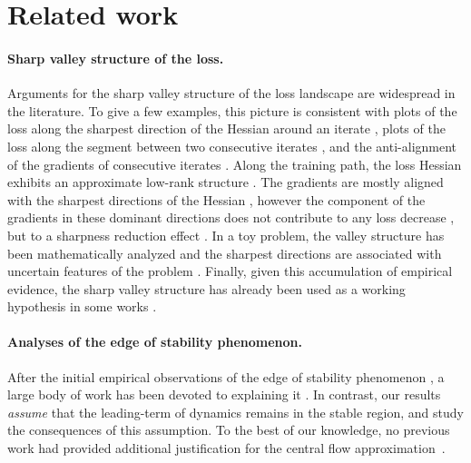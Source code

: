 \documentclass[11pt,english,reqno]{article}
\theoremstyle{plain}
\theoremstyle{definition}
\theoremstyle{remark}
\numberwithin{equation}{section}
\begin{document}
\section{Related work}
\label{sec:related}

\paragraph{Sharp valley structure of the loss.} Arguments for the sharp valley structure of the loss landscape are widespread in the literature. To give a few examples, this picture is consistent with plots of the loss along the sharpest direction of the Hessian around an iterate \cite{jastrzkebski2018relation}, plots of the loss along the segment between two consecutive iterates \cite{xing2018walk}, and the anti-alignment of the gradients of consecutive iterates \cite{xing2018walk}. Along the training path, the loss Hessian exhibits an approximate low-rank structure \cite{sagun2016eigenvalues, sagun2017empirical, ghorbani2019investigation, pmlr-v97-papyan19a, papyan2020traces,ben2024high}. The gradients are mostly aligned with the sharpest directions of the Hessian \cite{gur2018gradient,li2020hessian}, however the component of the gradients in these dominant directions does not contribute to any loss decrease \cite{jastrzkebski2018relation,song2025does}, but to a sharpness reduction effect \cite{so2026mini}. In a toy problem, the valley structure has been mathematically analyzed and the sharpest directions are associated with uncertain features of the problem \cite{wen2024understanding}. Finally, given this accumulation of empirical evidence, the sharp valley structure has already been used as a working hypothesis in some works \cite{liu2025focus, liu2025neural}. 

\paragraph{Analyses of the edge of stability phenomenon.} After the initial empirical observations of the edge of stability phenomenon \cite{jastrzkebski2018relation,jastrzebski2020break,cohen2021gradient}, a large body of work has been devoted to explaining it \cite{ahn2022understanding,arora2022understanding,wang2022analyzing,damian2022self,zhu2022understanding,ma2022beyond,pmlr-v202-agarwala23b,chen2023beyond,kreisler2023gradient,song2023trajectory,wu2023implicit,wu2024large,cai2024large,wang2025good,kalra2025universal,ghosh2025learning,yoo2025understanding,liu2026minimalist, wu2026large,litman2026origin}. In contrast, our results \emph{assume} that the leading-term of dynamics remains in the stable region, and study the consequences of this assumption. To the best of our knowledge, no previous work had provided additional justification for the central flow approximation~\cite{cohen2024understanding}. 
\end{document}

